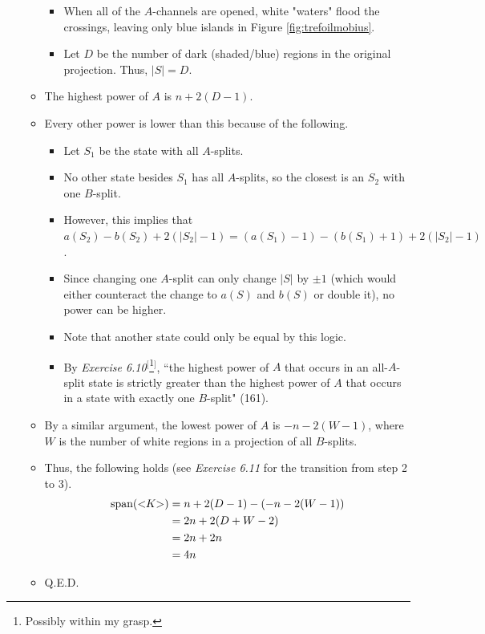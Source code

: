 \documentclass[titlepage]{article}
\numberwithin{figure}{section}
\numberwithin{table}{section}
\numberwithin{equation}{section}
\newcommand{\dq}[2]{``#1" (#2).}
\newcommand{\lbq}{<\hspace{-3pt}}
\newcommand{\rbq}{\hspace{-3pt}>}
\begin{document}
\begin{itemize}
\begin{itemize}
\begin{itemize}
            \item When all of the $A$-channels are opened, white "waters" flood the crossings, leaving only blue islands in Figure \ref{fig:trefoilmobius}.
            \item Let $D$ be the number of dark (shaded/blue) regions in the original projection. Thus, $|S|=D$.
        \end{itemize}
        \item The highest power of $A$ is $n+2(D-1)$.
        \item Every other power is lower than this because of the following.
        \begin{itemize}
            \item Let $S_1$ be the state with all $A$-splits.
            \item No other state besides $S_1$ has all $A$-splits, so the closest is an $S_2$ with one $B$-split.
            \item However, this implies that $a(S_2)-b(S_2)+2(|S_2|-1)=(a(S_1)-1)-(b(S_1)+1)+2(|S_2|-1)$.
            \item Since changing one $A$-split can only change $|S|$ by $\pm 1$ (which would either counteract the change to $a(S)$ and $b(S)$ or double it), no power can be higher.
            \item Note that another state could only be equal by this logic.
            \item By \emph{Exercise 6.10}$^[$\footnote{Possibly within my grasp.}$^]$, \dq{the highest power of $A$ that occurs in an all-$A$-split state is strictly greater than the highest power of $A$ that occurs in a state with exactly one $B$-split}{161}
        \end{itemize}
        \item By a similar argument, the lowest power of $A$ is $-n-2(W-1)$, where $W$ is the number of white regions in a projection of all $B$-splits.
        \item Thus, the following holds (see \emph{Exercise 6.11} for the transition from step 2 to 3).
        \begin{align*}
            \text{span}(\lbq K\rbq) &= n+2(D-1)-(-n-2(W-1))\\
            &= 2n+2(D+W-2)\\
            &= 2n+2n\\
            &= 4n
        \end{align*}
        \item Q.E.D.
    \end{itemize}

\end{itemize}
\end{document}
